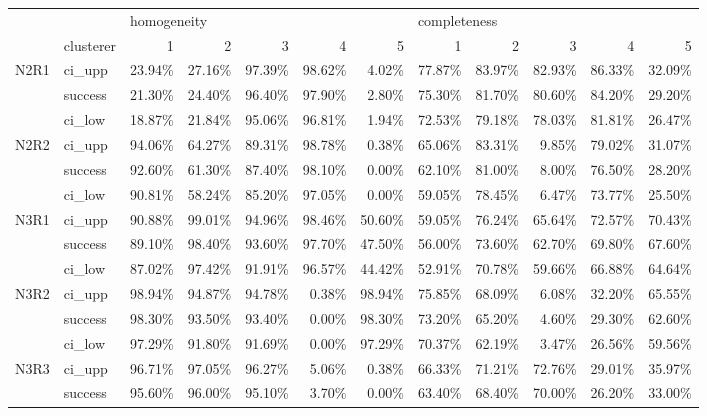 \begin{tabular}{llrrrrrrrrrr}
\toprule
     & {} & \multicolumn{5}{l}{homogeneity} & \multicolumn{5}{l}{completeness} \\
     & clusterer &           1 &      2 &      3 &      4 &      5 &            1 &      2 &      3 &      4 &      5 \\
\midrule
N2R1 & ci\_upp &      23.94\% & 27.16\% & 97.39\% & 98.62\% &  4.02\% &       77.87\% & 83.97\% & 82.93\% & 86.33\% & 32.09\% \\
     & success &      21.30\% & 24.40\% & 96.40\% & 97.90\% &  2.80\% &       75.30\% & 81.70\% & 80.60\% & 84.20\% & 29.20\% \\
     & ci\_low &      18.87\% & 21.84\% & 95.06\% & 96.81\% &  1.94\% &       72.53\% & 79.18\% & 78.03\% & 81.81\% & 26.47\% \\
N2R2 & ci\_upp &      94.06\% & 64.27\% & 89.31\% & 98.78\% &  0.38\% &       65.06\% & 83.31\% &  9.85\% & 79.02\% & 31.07\% \\
     & success &      92.60\% & 61.30\% & 87.40\% & 98.10\% &  0.00\% &       62.10\% & 81.00\% &  8.00\% & 76.50\% & 28.20\% \\
     & ci\_low &      90.81\% & 58.24\% & 85.20\% & 97.05\% &  0.00\% &       59.05\% & 78.45\% &  6.47\% & 73.77\% & 25.50\% \\
N3R1 & ci\_upp &      90.88\% & 99.01\% & 94.96\% & 98.46\% & 50.60\% &       59.05\% & 76.24\% & 65.64\% & 72.57\% & 70.43\% \\
     & success &      89.10\% & 98.40\% & 93.60\% & 97.70\% & 47.50\% &       56.00\% & 73.60\% & 62.70\% & 69.80\% & 67.60\% \\
     & ci\_low &      87.02\% & 97.42\% & 91.91\% & 96.57\% & 44.42\% &       52.91\% & 70.78\% & 59.66\% & 66.88\% & 64.64\% \\
N3R2 & ci\_upp &      98.94\% & 94.87\% & 94.78\% &  0.38\% & 98.94\% &       75.85\% & 68.09\% &  6.08\% & 32.20\% & 65.55\% \\
     & success &      98.30\% & 93.50\% & 93.40\% &  0.00\% & 98.30\% &       73.20\% & 65.20\% &  4.60\% & 29.30\% & 62.60\% \\
     & ci\_low &      97.29\% & 91.80\% & 91.69\% &  0.00\% & 97.29\% &       70.37\% & 62.19\% &  3.47\% & 26.56\% & 59.56\% \\
N3R3 & ci\_upp &      96.71\% & 97.05\% & 96.27\% &  5.06\% &  0.38\% &       66.33\% & 71.21\% & 72.76\% & 29.01\% & 35.97\% \\
     & success &      95.60\% & 96.00\% & 95.10\% &  3.70\% &  0.00\% &       63.40\% & 68.40\% & 70.00\% & 26.20\% & 33.00\% \\

\end{tabular}
